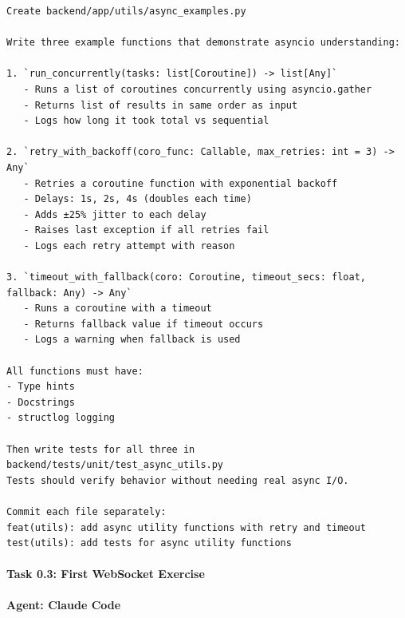 \documentclass[
  11pt,
]{article}
\begin{document}
\begin{lstlisting}
Create backend/app/utils/async_examples.py

Write three example functions that demonstrate asyncio understanding:

1. `run_concurrently(tasks: list[Coroutine]) -> list[Any]`
   - Runs a list of coroutines concurrently using asyncio.gather
   - Returns list of results in same order as input
   - Logs how long it took total vs sequential

2. `retry_with_backoff(coro_func: Callable, max_retries: int = 3) -> Any`
   - Retries a coroutine function with exponential backoff
   - Delays: 1s, 2s, 4s (doubles each time)
   - Adds ±25% jitter to each delay
   - Raises last exception if all retries fail
   - Logs each retry attempt with reason

3. `timeout_with_fallback(coro: Coroutine, timeout_secs: float, fallback: Any) -> Any`
   - Runs a coroutine with a timeout
   - Returns fallback value if timeout occurs
   - Logs a warning when fallback is used

All functions must have:
- Type hints
- Docstrings
- structlog logging

Then write tests for all three in backend/tests/unit/test_async_utils.py
Tests should verify behavior without needing real async I/O.

Commit each file separately:
feat(utils): add async utility functions with retry and timeout
test(utils): add tests for async utility functions
\end{lstlisting}

\hypertarget{task-0.3-first-websocket-exercise}{%
\paragraph{Task 0.3: First WebSocket
Exercise}\label{task-0.3-first-websocket-exercise}}

\textbf{Agent: Claude Code}
\end{document}
